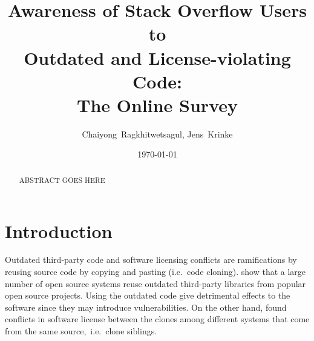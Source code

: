 \documentclass{svjour3}                     %
\begin{document}
\title{Awareness of Stack Overflow Users to\\ Outdated and License-violating Code:\\ The Online Survey}


\author{Chaiyong~Ragkhitwetsagul, Jens~Krinke}


\institute{Chaiyong Ragkhitwetsagul~(\Letter), Jens Krinke \at
              Computer Science Department., University College London, UK \\
              Tel.: +44 (0)20 7679,  Fax: +44 (0)20 7387 1397\\
              \email{\{ucabagk, j.krinke\}@ucl.ac.uk}           %
}

\date{\today}


\maketitle

\begin{abstract}
ABSTRACT GOES HERE
\end{abstract}

\section{Introduction}

Outdated third-party code and software licensing conflicts are ramifications by
reusing source code by copying and pasting (i.e.~code cloning). \cite{Xia2014}
show that a large number of open source systems reuse outdated third-party
libraries from popular open source projects. Using the outdated code give
detrimental effects to the software since they may introduce vulnerabilities. On
the other hand, \cite{German2009} found conflicts in software license between
the clones among different systems that come from the same source,~i.e.~clone
siblings.
\end{document}

